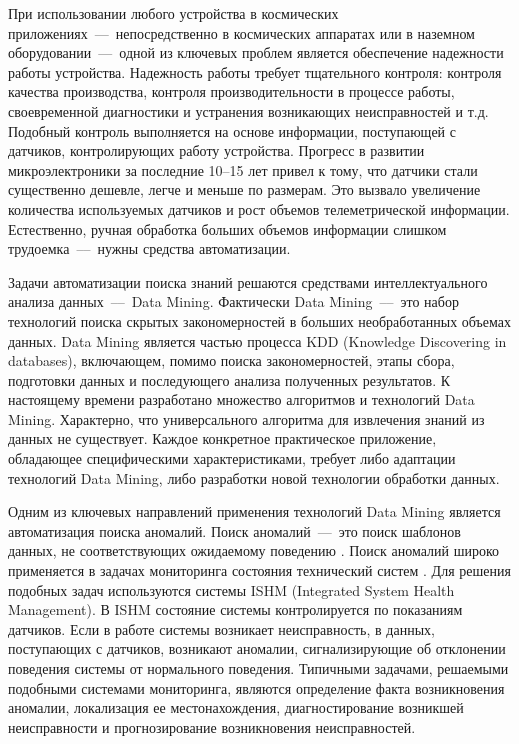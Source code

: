 При использовании любого устройства в космических приложениях~---~непосредственно в космических аппаратах или в наземном оборудовании~---~одной из ключевых проблем является обеспечение надежности работы устройства. Надежность работы требует тщательного контроля: контроля качества производства, контроля производительности в процессе работы, своевременной  диагностики и устранения возникающих неисправностей и т.д. Подобный контроль выполняется на основе информации, поступающей с датчиков, контролирующих работу устройства. Прогресс в развитии микроэлектроники за последние 10--15 лет привел к тому, что датчики стали существенно дешевле, легче и меньше по размерам. Это вызвало увеличение количества  используемых  датчиков  и  рост  объемов телеметрической  информации. Естественно, ручная обработка больших объемов  информации слишком трудоемка~–--~нужны средства автоматизации.

Задачи автоматизации поиска знаний решаются средствами интеллектуального анализа данных~--–~Data Mining. Фактически Data Mining~–--~это набор технологий поиска скрытых закономерностей в больших необработанных объемах данных. Data Mining является частью процесса KDD (Knowledge Discovering in databases), включающем, помимо поиска закономерностей, этапы сбора, подготовки данных и последующего анализа полученных результатов. К настоящему времени разработано множество алгоритмов и технологий Data Mining. Характерно, что универсального алгоритма для извлечения знаний из данных не существует. Каждое конкретное практическое приложение, обладающее специфическими характеристиками, требует либо адаптации технологий Data Mining, либо разработки новой технологии обработки данных.

Одним из ключевых направлений применения технологий Data Mining является автоматизация поиска аномалий. Поиск аномалий~---~это поиск шаблонов данных, не соответствующих ожидаемому поведению \cite{AnomalyDetectionASurvey}. Поиск аномалий широко применяется в задачах мониторинга состояния технический систем \cite{DerevyanenkoDataMining}. Для решения подобных задач используются системы ISHM (Integrated System Health Management). В ISHM состояние системы  контролируется по показаниям датчиков. Если в работе системы возникает  неисправность, в данных, поступающих с датчиков, возникают аномалии,  сигнализирующие об отклонении поведения системы от нормального поведения. Типичными задачами, решаемыми подобными системами мониторинга, являются определение факта возникновения аномалии, локализация ее местонахождения, диагностирование возникшей неисправности и прогнозирование возникновения неисправностей.

